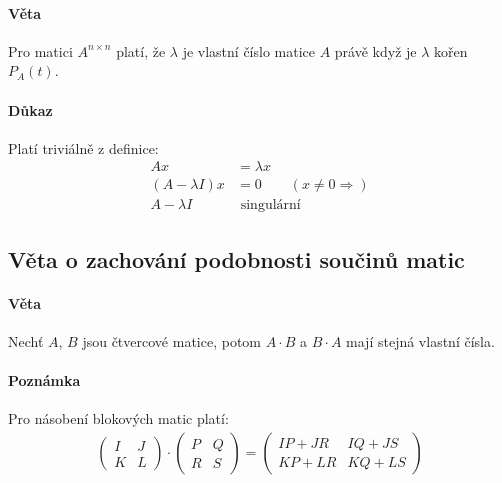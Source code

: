 \documentclass[a4paper,10pt]{article}
\begin{document}
\paragraph{Věta}
Pro matici $A^{n\times n}$ platí, že $\lambda$ je vlastní číslo matice $A$ právě
když je $\lambda$ kořen $P_A(t)$.
\paragraph{Důkaz}
Platí triviálně z definice:
\begin{align}
	Ax &= \lambda x  \\
	(A - \lambda I) x &= 0 \qquad (x \neq 0 \Rightarrow)\\
	A - \lambda I & \text{ singulární }
\end{align}

\subsection{Věta o zachování podobnosti součinů matic}
\setcounter{equation}{0}
\paragraph{Věta}
Nechť $A$, $B$ jsou čtvercové matice, potom $A\cdot B$ a $B \cdot A$ mají stejná
vlastní čísla.
\paragraph{Poznámka}
Pro násobení blokových matic platí:
\begin{align*}
	\left( \begin{matrix}
		I & J \\ K & L
	\end{matrix}\right)
	\cdot
	\left( \begin{matrix}
		P & Q \\ R & S
	\end{matrix}\right)
	=
	\left( \begin{matrix}
		IP + JR & IQ +JS \\ KP + LR & KQ + LS
	\end{matrix}\right)
\end{align*}
\end{document}
